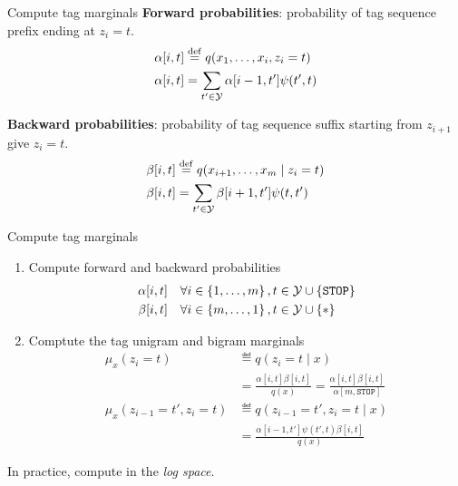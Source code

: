 \documentclass[usenames,dvipsnames,notes]{beamer}
\begin{document}
\begin{frame}
    {Compute tag marginals}
    \textbf{Forward probabilities}: probability of tag sequence prefix ending at $z_i=t$.
    \begin{align*}
        \alpha[i,t] &\stackrel{\rm def}{=} q(x_1,\ldots,x_i,z_i=t) \\
        \alpha[i,t] &= \sum_{t'\in\mathcal{Y}} \alpha[i-1,t']\psi(t',t)
    \end{align*}

    \textbf{Backward probabilities}: probability of tag sequence suffix starting from $z_{i+1}$ give $z_i=t$.
    \begin{align*}
        \beta[i,t] &\stackrel{\rm def}{=} q(x_{i+1},\ldots,x_m\mid z_i=t) \\
        \beta[i,t] &= \sum_{t'\in\mathcal{Y}} \beta[i+1,t']\psi(t,t')
    \end{align*}
\end{frame}

\begin{frame}
    {Compute tag marginals}
    \begin{enumerate}
        \item Compute forward and backward probabilities
            \begin{align*}
                \alpha[i,t] &\quad \forall i\in\left\{ 1,\ldots,m \right\}, t\in\mathcal{Y}\cup\left\{ \texttt{STOP} \right\}\\
                \beta[i,t] &\quad \forall i\in\left\{ m,\dots,1 \right\}, t\in\mathcal{Y}\cup\left\{ * \right\}
            \end{align*}
        \item Comptute the tag unigram and bigram marginals
    \begin{align*}
        \mu_x(z_i=t) &\eqdef q(z_i=t\mid x) \\
        &= \frac{\alpha[i,t]\beta[i,t]}{q(x)}
        = \frac{\alpha[i,t]\beta[i,t]}{\alpha[m,\texttt{STOP}]} \\
        \mu_x(z_{i-1}=t',z_i=t) &\eqdef q(z_{i-1}=t',z_i=t\mid x) \\
        &= \frac{\alpha[i-1,t']\psi(t',t)\beta[i,t]}{q(x)}
    \end{align*}
    \end{enumerate}
    In practice, compute in the \emph{log space}.
\end{frame}
\end{document}
